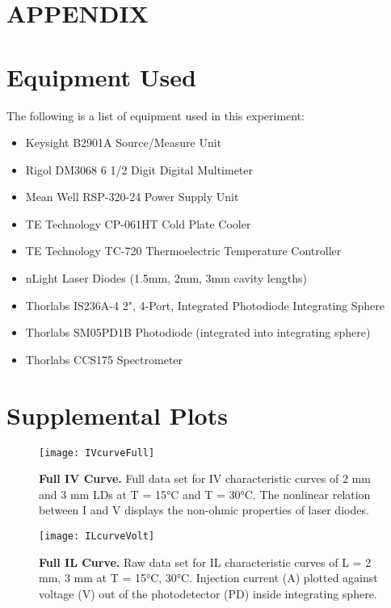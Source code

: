 \documentclass[9pt,twocolumn,twoside]{osajnl}
\begin{document}



\newpage
\clearpage

\appendix
\section*{APPENDIX}

\section{Equipment Used}
The following is a list of equipment used in this experiment:
\begin{itemize}
    \item Keysight B2901A Source/Measure Unit \cite{SMU}
    \item Rigol DM3068 6 1/2 Digit Digital Multimeter \cite{DMM}
    \item Mean Well RSP-320-24 Power Supply Unit \cite{PSU}
    \item TE Technology CP-061HT Cold Plate Cooler \cite{Peltier}
    \item TE Technology TC-720 Thermoelectric Temperature Controller \cite{TEC}
    \item nLight Laser Diodes (1.5mm, 2mm, 3mm cavity lengths)
    \item Thorlabs IS236A-4 2", 4-Port, Integrated Photodiode Integrating Sphere \cite{IntSphere}
    \item Thorlabs SM05PD1B Photodiode (integrated into integrating sphere) \cite{ThorlabsPD}
    \item Thorlabs CCS175 Spectrometer \cite{Spectrometer}
\end{itemize}

\section{Supplemental Plots}


\begin{figure}[H]
\centering
\texttt{[image: IVcurveFull]}
\caption{\textbf{Full IV Curve.} Full data set for IV characteristic curves of 2 mm and 3 mm LDs at T = 15°C and T = 30°C. The nonlinear relation between I and V displays the non-ohmic properties of laser diodes.}
\label{fig:IVfull}
\end{figure}

\begin{figure}[H]
\centering
\texttt{[image: ILcurveVolt]}
\caption{\textbf{Full IL Curve.} Raw data set for IL characteristic curves of L = 2 mm, 3 mm at T = 15°C, 30°C. Injection current (A) plotted against voltage (V) out of the photodetector (PD) inside integrating sphere.}
\label{fig:ILfull}
\end{figure}
\end{document}
